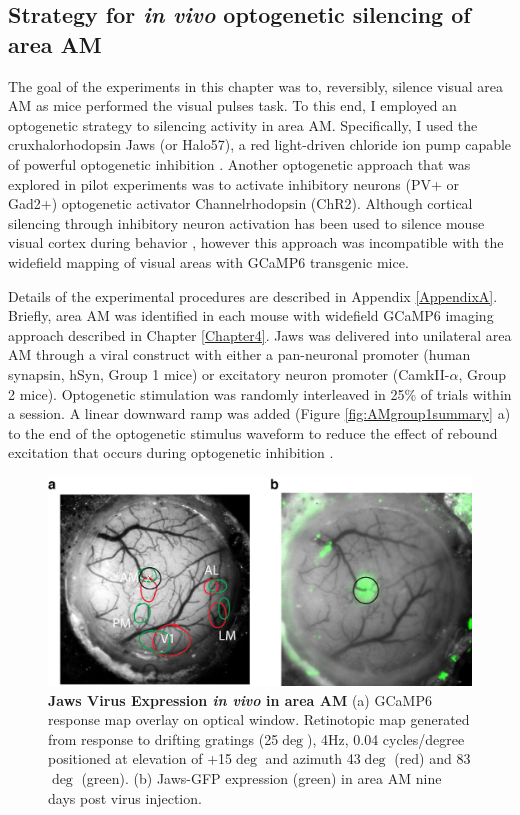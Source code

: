 \subsection{Strategy for \emph{in vivo} optogenetic silencing of area AM}
The goal of the experiments in this chapter was to, reversibly, silence visual area AM as mice performed the visual pulses task. To this end, I employed an optogenetic strategy to silencing activity in area AM. Specifically, I used the cruxhalorhodopsin Jaws (or Halo57), a red light-driven chloride ion pump capable of powerful optogenetic inhibition \parencite{Chuong2014,Acker2016}. Another optogenetic approach that was explored in pilot experiments was to activate inhibitory neurons (PV+ or Gad2+)  optogenetic activator Channelrhodopsin (ChR2). Although cortical silencing through inhibitory neuron activation has been used to silence mouse visual cortex during behavior \parencite{Madisen2012,Glickfeld2013b,Poort2015,Burgess2016}, however this approach was incompatible with the widefield mapping of visual areas with GCaMP6 transgenic mice.\par
Details of the experimental procedures are described in Appendix \ref{AppendixA}. Briefly, area AM was identified in each mouse with widefield GCaMP6 imaging approach described in Chapter \ref{Chapter4}. Jaws was delivered into unilateral area AM through a viral construct with either a pan-neuronal promoter (human synapsin, hSyn, Group 1 mice) or excitatory neuron promoter (CamkII-$\alpha$, Group 2 mice). Optogenetic stimulation was randomly interleaved in 25\% of trials within a session. A linear downward ramp was added (Figure \ref{fig:AMgroup1summary} a) to the end of the optogenetic stimulus waveform to reduce the effect of rebound excitation that occurs during optogenetic inhibition \parencite{Chuong2014,Guo2014b}.
\begin{figure}
  \centering
   \includegraphics[width=\textwidth]{Figures/chapter4/kg07_jaws_gfp_expression.png}
  \caption[Jaws Virus Expression \emph{in vivo} in Area AM]{\textbf{Jaws Virus Expression \emph{in vivo} in area AM} (a) GCaMP6 response map overlay on optical window. Retinotopic map generated from response to drifting gratings (25$\deg$), 4Hz, 0.04 cycles/degree positioned at elevation of +15$\deg$ and azimuth 43$\deg$ (red) and 83$\deg$ (green). (b) Jaws-GFP expression (green) in area AM nine days post virus injection. }
   \label{fig:virusexp}
\end{figure}
